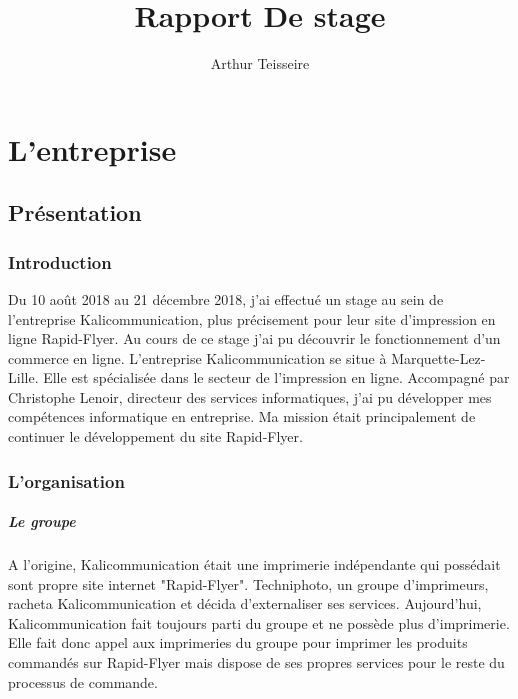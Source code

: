 \documentclass[a4paper]{report}
\title{Rapport De stage}
\author{Arthur Teisseire}
\begin{document}
\tableofcontents
\part{L'entreprise}
\chapter{Présentation}
\section{Introduction}
Du 10 août 2018 au 21 décembre 2018, j'ai effectué un stage au sein de l'entreprise Kalicommunication, plus précisement pour leur site d'impression en ligne Rapid-Flyer. Au cours de ce stage j'ai pu découvrir le fonctionnement d'un commerce en ligne.\newline
L'entreprise Kalicommunication se situe à Marquette-Lez-Lille. Elle est spécialisée dans le secteur de l'impression en ligne.\newline
Accompagné par Christophe Lenoir, directeur des services informatiques, j'ai pu développer mes compétences informatique en entreprise. Ma mission était principalement de continuer le développement du site Rapid-Flyer.
\section{L'organisation}
\subsubsection{Le groupe}
A l'origine, Kalicommunication était une imprimerie indépendante qui possédait sont propre site internet "Rapid-Flyer". Techniphoto, un groupe d'imprimeurs, racheta Kalicommunication et décida d'externaliser ses services. Aujourd'hui, Kalicommunication fait toujours parti du groupe et ne possède plus d'imprimerie. Elle fait donc appel aux imprimeries du groupe pour imprimer les produits commandés sur Rapid-Flyer mais dispose de ses propres services pour le reste du processus de commande.
\end{document}
